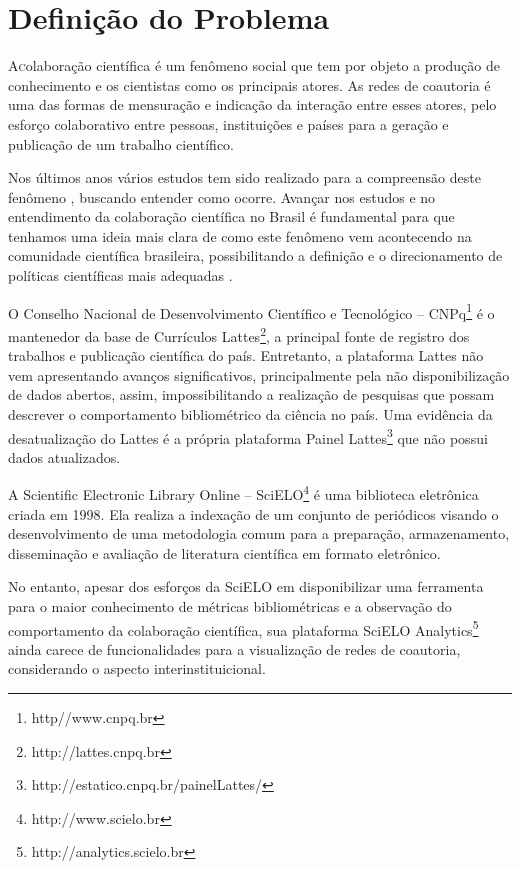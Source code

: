 

\section{\textbf{Definição do Problema}}\label{sec:def_Problema}

\lettrine{A} colaboração científica é um fenômeno social que tem  por objeto a produção de conhecimento e os cientistas como os principais atores. As redes de coautoria é uma das formas de mensuração e indicação da interação entre esses atores, pelo esforço colaborativo entre pessoas, instituições e países para a geração e publicação de um trabalho científico.

Nos últimos anos vários estudos tem sido realizado para a compreensão deste fenômeno \citep{Maia2008}, buscando entender como ocorre. 
Avançar nos estudos e no entendimento da colaboração científica no Brasil é fundamental para que tenhamos uma ideia mais clara de como este fenômeno vem acontecendo na comunidade científica brasileira, possibilitando a definição e o direcionamento de políticas científicas mais adequadas \citep{Vanz2010}.

O Conselho Nacional de Desenvolvimento Científico e Tecnológico -- CNPq\footnote{http//www.cnpq.br} é o mantenedor da base de Currículos Lattes\footnote{http://lattes.cnpq.br}, a principal fonte de registro dos trabalhos e publicação científica do país. 
Entretanto, a plataforma Lattes não vem apresentando avanços significativos, principalmente pela não disponibilização de dados abertos, assim, impossibilitando a realização de pesquisas que possam descrever o comportamento bibliométrico da ciência no país.
Uma evidência da desatualização do Lattes é a própria plataforma Painel Lattes\footnote{http://estatico.cnpq.br/painelLattes/} que não possui dados atualizados.

A Scientific Electronic Library Online -- SciELO\footnote{http://www.scielo.br} é uma biblioteca eletrônica criada em 1998.
Ela realiza a indexação de um conjunto de periódicos visando o desenvolvimento de uma metodologia comum para a preparação, armazenamento, disseminação e avaliação de literatura científica em formato eletrônico.

No entanto, apesar dos esforços da SciELO em disponibilizar uma ferramenta para o maior conhecimento de métricas bibliométricas e a observação do comportamento da colaboração científica, sua plataforma SciELO Analytics\footnote{http://analytics.scielo.br} ainda carece de funcionalidades para a visualização de redes de coautoria, considerando o aspecto interinstituicional.

